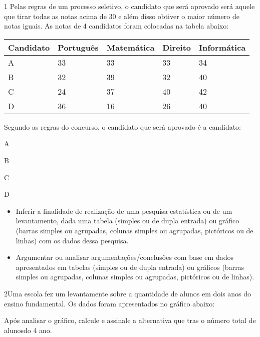 \num{1} Pelas regras de um processo seletivo, o candidato que será aprovado
será aquele que tirar todas as notas acima de 30 e além disso obtiver o
maior número de notas iguais. As notas de 4 candidatos foram colocadas
na tabela abaixo:

\begin{longtable}[]{@{}lllll@{}}
\toprule
Candidato & Português & Matemática & Direito &
Informática\tabularnewline
\midrule
\endhead
A & 33 & 33 & 33 & 34\tabularnewline
B & 32 & 39 & 32 & 40\tabularnewline
C & 24 & 37 & 40 & 42\tabularnewline
D & 36 & 16 & 26 & 40\tabularnewline
\bottomrule
\end{longtable}

Segundo as regras do concurso, o candidato que será aprovado é a
candidato:

\begin{escolha}
\item
  A
\item
  B
\item
  C
\item
  D
\end{escolha}


\begin{itemize}
\item Inferir a finalidade de realização de uma pesquisa estatística ou de
um levantamento, dada uma tabela (simples ou de dupla entrada) ou
gráfico (barras simples ou agrupadas, colunas simples ou agrupadas,
pictóricos ou de linhas) com os dados dessa pesquisa.

\item Argumentar ou analisar argumentações/conclusões com base em dados
apresentados em tabelas (simples ou de dupla entrada) ou gráficos
(barras simples ou agrupadas, colunas simples ou agrupadas, pictóricos
ou de linhas).
\end{itemize}


\num{2}Uma escola fez um levantamente sobre a quantidade de alunos em dois
anos do ensino fundamental. Os dados foram apresentados no gráfico
abaixo:


Após analisar o gráfico, calcule e assinale a alternativa que tras o
número total de alunosdo 4 ano.


